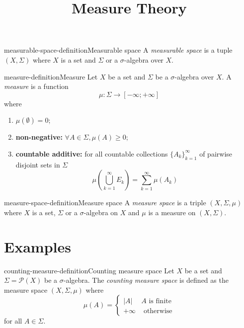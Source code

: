 \documentclass[preview]{standalone}
\begin{document}
\title{Measure Theory}
\genpage

\begin{snippetdefinition}{measurable-space-definition}{Measurable space}
    A \textit{measurable space} is a tuple \((X, \Sigma)\)
    where \(X\) is a set and \(\Sigma\) or a \(\sigma\)-algebra over \(X\).
\end{snippetdefinition}

\begin{snippetdefinition}{measure-definition}{Measure}
    Let \(X\) be a set and \(\Sigma\) be a \(\sigma\)-algebra over \(X\).
    A \textit{measure} is a function
    \[
        \mu\colon \Sigma \to [-\infty; + \infty]
    \]
    where
    \begin{enumerate}
        \item \(\mu(\emptyset) = 0\);
        \item \textbf{non-negative:} \(\forall A \in \Sigma, \mu(A) \geq 0\);
        \item \textbf{countable additive:} for all countable collections \({\{A_k\}}_{k=1}^\infty\)
        of pairwise disjoint sets in \(\Sigma\)
        \[
            \mu\left( \bigcup_{k=1}^\infty E_k \right)
            =
            \sum_{k=1}^\infty \mu(A_k)
        \]
    \end{enumerate}
\end{snippetdefinition}

\begin{snippetdefinition}{measure-space-definition}{Measure space}
    A \textit{measure space} is a triple \((X, \Sigma, \mu)\)
    where \(X\) is a set, \(\Sigma\) or a \(\sigma\)-algebra on \(X\)
    and \(\mu\) is a measure on \((X, \Sigma)\).
\end{snippetdefinition}

\section{Examples}

\begin{snippetdefinition}{counting-measure-definition}{Counting measure space}
    Let \(X\) be a set and \(\Sigma = \mathcal{P}(X)\) be a \(\sigma\)-algebra.
    The \textit{counting measure space}
    is defined as the measure space \((X, \Sigma, \mu)\)
    where
    \[
        \mu(A) = \begin{cases}
            |A| & A \text{ is finite} \\
            +\infty & \text{ otherwise}
        \end{cases}
    \]
    for all \(A \in \Sigma\).
\end{snippetdefinition}

\end{document}
